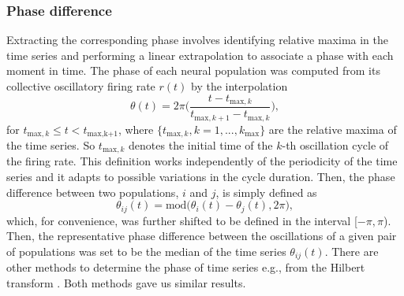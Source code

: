 \documentclass[../main.tex]{subfiles}
\begin{document}
\subsubsection{Phase difference}
Extracting the corresponding phase involves identifying relative maxima in the time series and performing a linear extrapolation to associate a phase with each moment in time.
The phase of each neural population was computed from its collective oscillatory firing rate $r(t)$ by the interpolation
\begin{equation}
	\theta(t) = 2\pi\Bigg(\displaystyle\frac{t-t_{\text{max},k}}{t_{\text{max},k+1}-t_{\text{max},k}}\Bigg),
	\label{eq:phase_aproximation}
\end{equation}
for $t_{\text{max},k} \leq t < t_{\text{max,k+1}}$, where $\{t_{\text{max},k},k=1, ..., k_{\text{max}}\}$ are the relative maxima of the time series. 
So $t_{\text{max},k}$ denotes the initial time of the $k$-th oscillation cycle of the firing rate. 
This definition works independently of the periodicity of the time series and it adapts to possible variations in the cycle duration.
Then, the phase difference between two populations, $i$ and $j$, is simply defined as
\begin{equation}
	\theta_{ij}(t) = \text{mod}\Big(\theta_i(t)-\theta_j(t),2\pi\Big),
	\label{eq:phase_escaled}
\end{equation}
which, for convenience, was further shifted to be defined in the interval [$-\pi,\pi$).
Then, the representative phase difference between the oscillations of a given pair of populations was set to be the median of the time series $\theta_{ij}(t)$.
There are other methods to determine the phase of time series e.g., from the Hilbert transform \citep{cohen_time-frequency_1995}.
Both methods gave us similar results.
\end{document}
